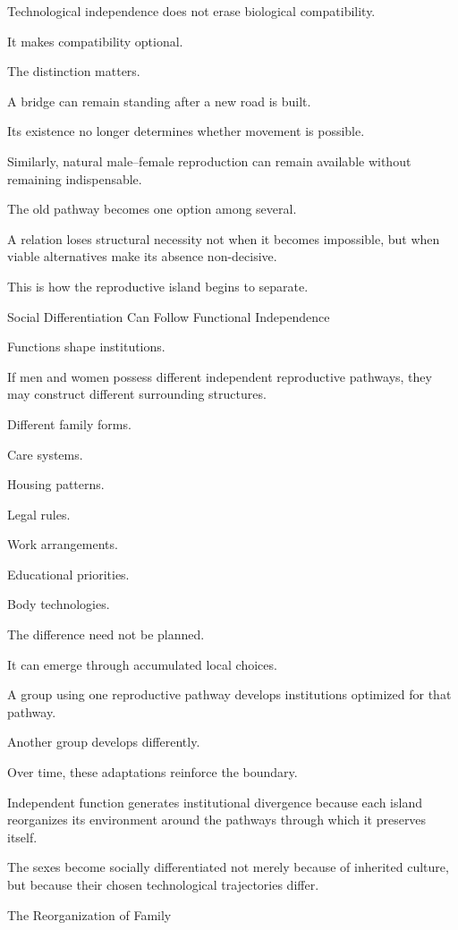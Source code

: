 Technological independence does not erase biological compatibility.

It makes compatibility optional.

The distinction matters.

A bridge can remain standing after a new road is built.

Its existence no longer determines whether movement is possible.

Similarly, natural male–female reproduction can remain available without remaining indispensable.

The old pathway becomes one option among several.

A relation loses structural necessity not when it becomes impossible, but when viable alternatives make its absence non-decisive.

This is how the reproductive island begins to separate.

Social Differentiation Can Follow Functional Independence

Functions shape institutions.

If men and women possess different independent reproductive pathways, they may construct different surrounding structures.

Different family forms.

Care systems.

Housing patterns.

Legal rules.

Work arrangements.

Educational priorities.

Body technologies.

The difference need not be planned.

It can emerge through accumulated local choices.

A group using one reproductive pathway develops institutions optimized for that pathway.

Another group develops differently.

Over time, these adaptations reinforce the boundary.

Independent function generates institutional divergence because each island reorganizes its environment around the pathways through which it preserves itself.

The sexes become socially differentiated not merely because of inherited culture, but because their chosen technological trajectories differ.

The Reorganization of Family


